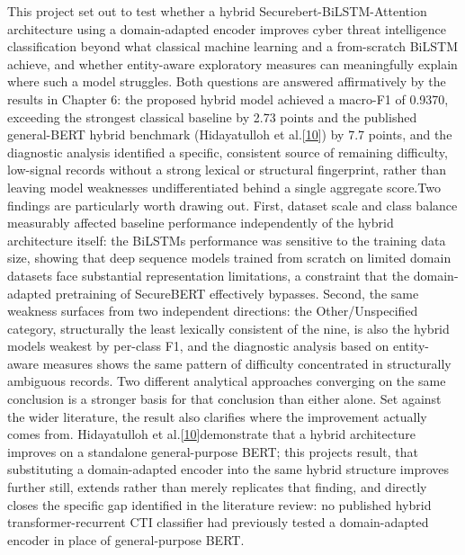 \documentclass[12pt,a4paper]{report}
\begin{document}
This project set out to test whether a hybrid
Securebert-BiLSTM-Attention architecture using a domain-adapted encoder
improves cyber threat intelligence classification beyond what classical
machine learning and a from-scratch BiLSTM achieve, and whether
entity-aware exploratory measures can meaningfully explain where such a
model struggles. Both questions are answered affirmatively by the
results in Chapter 6: the proposed hybrid model achieved a macro-F1 of
0.9370, exceeding the strongest classical baseline by 2.73 points and
the published general-BERT hybrid benchmark (Hidayatulloh et
al.{[}\href{file:///D:/Downloads/final-report-formatted-v4(1).docx\#ref_10}{\ul{10}}{]})
by 7.7 points, and the diagnostic analysis identified a specific,
consistent source of remaining difficulty, low-signal records without a
strong lexical or structural fingerprint, rather than leaving model
weaknesses undifferentiated behind a single aggregate score.Two findings
are particularly worth drawing out. First, dataset scale and class
balance measurably affected baseline performance independently of the
hybrid architecture itself: the BiLSTM\textquotesingle s performance was
sensitive to the training data size, showing that deep sequence models
trained from scratch on limited domain datasets face substantial
representation limitations, a constraint that the domain-adapted
pretraining of SecureBERT effectively bypasses. Second, the same
weakness surfaces from two independent directions: the Other/Unspecified
category, structurally the least lexically consistent of the nine, is
also the hybrid model\textquotesingle s weakest by per-class F1, and the
diagnostic analysis based on entity-aware measures shows the same
pattern of difficulty concentrated in structurally ambiguous records.
Two different analytical approaches converging on the same conclusion is
a stronger basis for that conclusion than either alone. Set against the
wider literature, the result also clarifies where the improvement
actually comes from. Hidayatulloh et
al.{[}\href{file:///D:/Downloads/final-report-formatted-v4(1).docx\#ref_10}{\ul{10}}{]}demonstrate
that a hybrid architecture improves on a standalone general-purpose
BERT; this project\textquotesingle s result, that substituting a
domain-adapted encoder into the same hybrid structure improves further
still, extends rather than merely replicates that finding, and directly
closes the specific gap identified in the literature review: no
published hybrid transformer-recurrent CTI classifier had previously
tested a domain-adapted encoder in place of general-purpose BERT.
\end{document}

